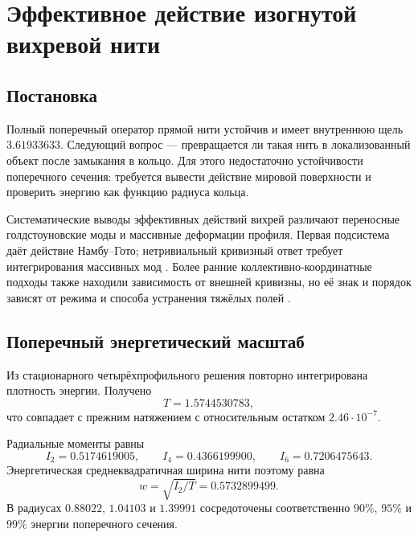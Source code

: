 \chapter{Эффективное действие изогнутой вихревой нити}
\label{ch:v6-bosonic-defect-curved-string-effective-action-gate}

\section{Постановка}

Полный поперечный оператор прямой нити устойчив и имеет внутреннюю щель
$3.61933633$. Следующий вопрос --- превращается ли такая нить в
локализованный объект после замыкания в кольцо. Для этого недостаточно
устойчивости поперечного сечения: требуется вывести действие мировой
поверхности и проверить энергию как функцию радиуса кольца.

Систематические выводы эффективных действий вихрей различают переносные
голдстоуновские моды и массивные деформации профиля. Первая подсистема даёт
действие Намбу--Гото; нетривиальный кривизный ответ требует интегрирования
массивных мод \cite{curved-string-aurrekoetxea,curved-string-anderson}.
Более ранние коллективно-координатные подходы также находили зависимость от
внешней кривизны, но её знак и порядок зависят от режима и способа устранения
тяжёлых полей \cite{curved-string-orland,curved-string-eto}.

\section{Поперечный энергетический масштаб}

Из стационарного четырёхпрофильного решения повторно интегрирована плотность
энергии. Получено
\begin{equation}
 T=1.5744530783,
\end{equation}
что совпадает с прежним натяжением с относительным остатком
$2.46\cdot10^{-7}$.

Радиальные моменты равны
\begin{equation}
 I_2=0.5174619005,
 \qquad
 I_4=0.4366199900,
 \qquad
 I_6=0.7206475643.
\end{equation}
Энергетическая среднеквадратичная ширина нити поэтому равна
\begin{equation}
 w=\sqrt{I_2/T}=0.5732899499.
\end{equation}
В радиусах $0.88022$, $1.04103$ и $1.39991$ сосредоточены соответственно
$90\%$, $95\%$ и $99\%$ энергии поперечного сечения.


